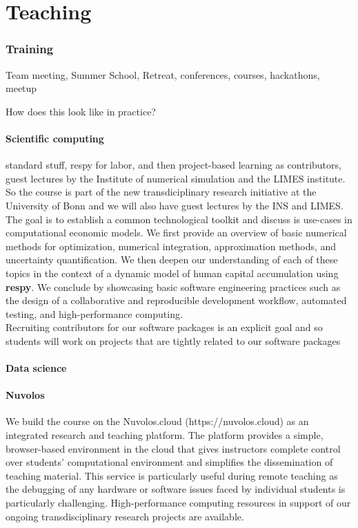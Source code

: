 \section{Teaching}

\subsubsection*{Training} Team meeting, Summer School, Retreat, conferences, courses, hackathons, meetup


How does this look like in practice?

\paragraph{Scientific computing} standard stuff, respy for labor, and then project-based learning as contributors, guest lectures by the Institute of numerical simulation and the LIMES institute. So the course is part of the new transdiciplinary research initiative at the University of Bonn and we will also have guest lectures by the INS and LIMES. The goal is to establish a common technological toolkit and discuss is use-cases in computational economic models. We first provide an overview of basic numerical methods for optimization, numerical integration, approximation methods, and uncertainty quantification. We then deepen our understanding of each of these topics in the context of a dynamic model of human capital accumulation using \textbf{respy}. We conclude by showcasing basic software engineering practices such as the design of a collaborative and reproducible development workflow, automated testing, and high-performance computing.\\

\noindent Recruiting contributors for our software packages is an explicit goal and so students will work on projects that are tightly related to our software packages

\paragraph{Data science}

\paragraph{Nuvolos} We build the course on the Nuvolos.cloud (https://nuvolos.cloud) as an integrated research and teaching platform. The platform provides a simple, browser-based environment in the cloud that gives instructors complete control over students’ computational environment and simplifies the dissemination of teaching material. This service is particularly useful during remote teaching as the debugging of any hardware or software issues faced by individual students is particularly challenging. High-performance computing resources in support of our ongoing transdisciplinary research projects are available.
